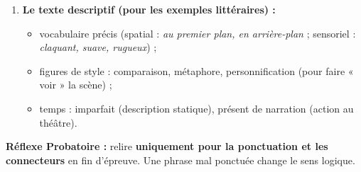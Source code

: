 \documentclass[11pt]{article}
\newcommand{\cle}[1]{{\popxbold\color{popdark}#1}}
\begin{document}
\begin{methode}
\begin{enumerate}
            \begin{itemize}
                \item \cle{Impersonnalisation / objectivité :} « Il convient de noter que... », « Il est indéniable que... », « On observe que... » (préférer « on » ou le passif à « je pense que »).
                \item \cle{Modalisation (nuance) :} adverbes (probablement, sans doute, apparemment), verbes modaux (pouvoir, devoir, sembler), conditionnel. \emph{Éviter les certitudes absolues :} « C'est certain que » $\rightarrow$ « Il semble que ».
                \item \cle{Marques explicites :} « Nous allons voir... », « Signalons que... », « Rappelons que... » (elles guident le correcteur).
            \end{itemize}
        \item \textbf{Le texte descriptif (pour les exemples littéraires) :}
            \begin{itemize}
                \item vocabulaire précis (spatial : \emph{au premier plan, en arrière-plan} ; sensoriel : \emph{claquant, suave, rugueux}) ;
                \item figures de style : comparaison, métaphore, personnification (pour faire « voir » la scène) ;
                \item temps : imparfait (description statique), présent de narration (action au théâtre).
            \end{itemize}
    \end{enumerate}
    \textbf{Réflexe Probatoire :} relire \textbf{uniquement pour la ponctuation et les connecteurs} en fin d'épreuve. Une phrase mal ponctuée change le sens logique.
\end{methode}
\end{document}
